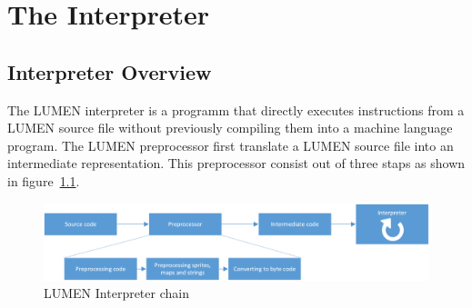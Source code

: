 \chapter{The Interpreter}
\label{cha:Interpreter}

\section{Interpreter Overview}
\par \noindent The LUMEN interpreter is a programm that directly executes instructions from a LUMEN source file without previously compiling them into a machine language program. The LUMEN preprocessor first translate a LUMEN source file into an 
intermediate representation. This preprocessor consist out of three staps as shown in figure~\ref{fig:InterpreterWorking}. \bigskip

\par \noindent 

\begin{figure}[h]
    \centering
	\includegraphics[width=13cm]{InterpreterWorking}
    \caption{LUMEN Interpreter chain}\par
    \label{fig:InterpreterWorking}
\end{figure}
